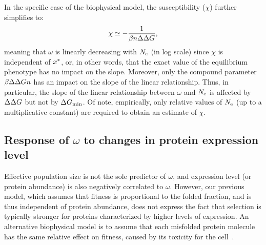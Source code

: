 \documentclass{article}
\begin{document}
In the specific case of the biophysical model, the susceptibility ($\chi$) further simplifies to:
\begin{gather}
    \chi \simeq -\dfrac{1}{\beta n \Delta \Delta G}, \label{eq:chi_application}
\end{gather}
meaning that $\omega$ is linearly decreasing with $N_{\text{e}}$ (in log scale) since $\chi$ is independent of $x^{*}$, or, in other words, that the exact value of the equilibrium {phenotype} has no impact on the slope.
Moreover, only the compound parameter $\beta \Delta \Delta G n$ has an impact on the slope of the linear relationship.
Thus, in particular, the slope of the linear relationship between $\omega$ and $N_{\text{e}}$ is affected by $\Delta \Delta G$ but not by $\Delta G_{\text{min}}$.
Of note, empirically, only relative values of $N_{\text{e}}$ (up to a multiplicative constant) are required to obtain an estimate of $\chi$.

\subsection{Response of $\omega$ to changes in protein expression level}
\label{sec:expression}

Effective population size is not the sole predictor of $\omega$, and expression level (or protein abundance) is also negatively correlated to $\omega$.
However, our previous model, which assumes that fitness is proportional to the folded fraction, and is thus independent of protein abundance, does not express the fact that selection is typically stronger for proteins characterized by higher levels of expression.
An alternative biophysical model is to assume that each misfolded protein molecule has the same relative effect on fitness, caused by its toxicity for the cell~\citep{Drummond2005a, Wilke2006, Drummond2008, Serohijos2012}.
\end{document}
